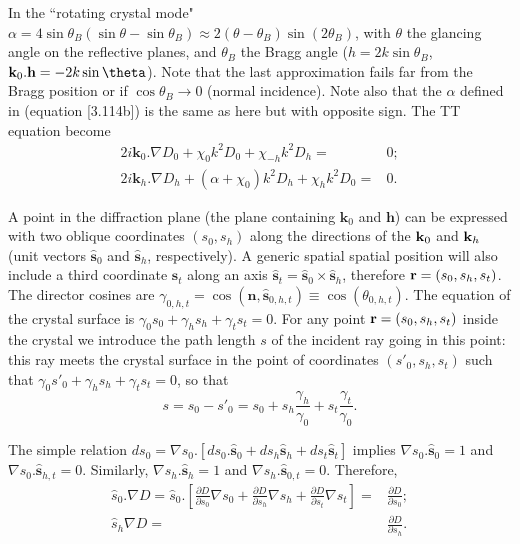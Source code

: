 \documentclass[preprint]{iucr}              %
\newcommand{\inred}[1]{{\color{red}#1}}
\begin{document}
In the ``rotating crystal mode" $\alpha=4 \sin \theta_B (\sin \theta - \sin \theta_B) \approx 2 (\theta-\theta_B) \sin (2\theta_B)$, with $\theta$ the glancing angle on the reflective planes, and $\theta_B$ the Bragg angle ($h=2 k \sin\theta_B$, $\textbf k_0 . \textbf h = -2 k \sin\theta$). Note that the last approximation fails far from the Bragg position or if $\cos\theta_B \rightarrow 0$ (normal incidence). \inred{Note also that the $\alpha$ defined in \cite{ZachariasenBook} (equation [3.114b]) is the same as here but with opposite sign.  }
The TT equation become
\begin{subequations}
\label{eq:TTvectorAlpha}
\begin{align}
2 i \textbf{k}_0 . \nabla D_0 + \chi_0 k^2 D_0 + \chi_{-h} k^2 D_h =& 0; \\
2 i \textbf{k}_h . \nabla D_h + (\alpha + \chi_0) k^2 D_h + \chi_{h} k^2 D_0 =& 0.
\end{align}
\end{subequations}

A point in the diffraction plane (the plane containing $\textbf{k}_0$ and $\textbf{h}$) 
can be expressed with two oblique coordinates $(s_0,s_h)$ along the directions of the $\textbf k_0$ and $\textbf k_h$ (unit vectors $\hat{ \textbf{s}}_{0}$ and $\hat{ \textbf{s}}_{h}$, respectively). A generic spatial spatial position will also include a third coordinate $\textbf{s}_t$ along an axis $\hat{\textbf{s}}_t=\hat{\textbf{s}}_0 \times \hat{\textbf{s}}_h$, therefore $\textbf r=(s_0,s_h,s_t)$. The director cosines are $\gamma_{0,h,t}=\cos(\textbf{n} , \hat{\textbf{s}}_{0,h,t}) \equiv \cos(\theta_{0,h,t})$. The equation of the crystal surface is $\gamma_0 s_0 + \gamma_h s_h + \gamma_t s_t=0$. For any point $\textbf r=(s_0,s_h,s_t)$ inside the crystal we introduce the path length $s$ \inred{of the incident ray going in this point}: this ray meets the crystal surface in the point of coordinates $(s'_0,s_h,s_t)$ such that $\gamma_0 s'_0+\gamma_h s_h + \gamma_t s_t=0$, so that 
\begin{equation}
\label{eq:s}
s = s_0 - s'_0 = s_0 + s_h \frac{\gamma_h}{\gamma_0} + s_t \frac{\gamma_t}{\gamma_0}.
\end{equation}

The simple relation $d s_0 = \nabla s_0 . [ d s_0 . \hat{\textbf{s}}_0 + d s_h \hat{\textbf{s}}_h + d s_t \hat{\textbf{s}}_t ]$ implies $\nabla s_0 . \hat{\textbf{s}}_0=1$ and $\nabla s_0 . \hat{\textbf{s}}_{h,t}=0$. Similarly, $\nabla s_h . \hat{\textbf{s}}_h=1$ and $\nabla s_h . \hat{\textbf{s}}_{0,t}=0$. Therefore, 
\begin{subequations}
\label{eq:equalities}
\begin{align}
\hat s_0 . \nabla D=
\hat s_0 . \left[ 
\frac{\partial D}{\partial s_0} \nabla s_0 + 
\frac{\partial D}{\partial s_h} \nabla s_h +
\frac{\partial D}{\partial s_t} \nabla s_t
\right] 
=& \frac{\partial D}{\partial s_0}
; \\
\hat s_h \nabla D =& 
\frac{\partial D}{\partial s_h}.
\end{align}
\end{subequations}
\end{document}
